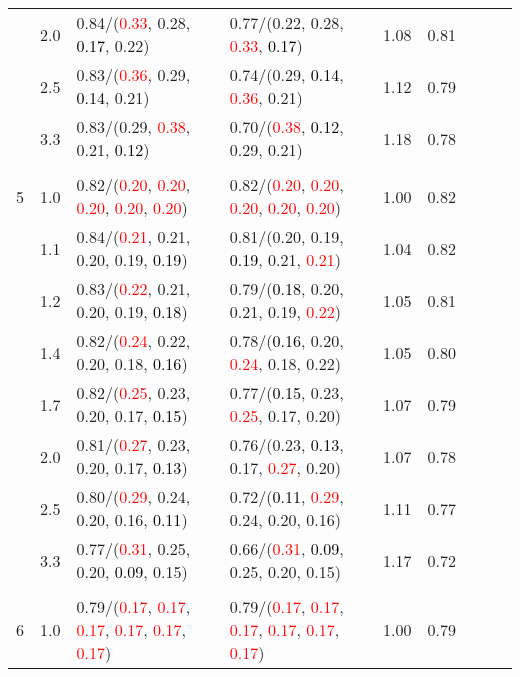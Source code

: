\documentclass[10pt,a4paper]{report}
\begin{document}
\begin{table}[!htbp]
\begin{center}
{\begin{tabular}{ccllccccc}
			&2.0&0.84/(\textcolor{red}{0.33}, 0.28, \textcolor{black}{0.17}, 0.22)&0.77/(0.22, 0.28, \textcolor{red}{0.33}, \textcolor{black}{0.17})&1.08&0.81\\
			&2.5&0.83/(\textcolor{red}{0.36}, 0.29, \textcolor{black}{0.14}, 0.21)&0.74/(0.29, \textcolor{black}{0.14}, \textcolor{red}{0.36}, 0.21)&1.12&0.79\\
			&3.3&0.83/(0.29, \textcolor{red}{0.38}, 0.21, \textcolor{black}{0.12})&0.70/(\textcolor{red}{0.38}, \textcolor{black}{0.12}, 0.29, 0.21)&1.18&0.78\\
			&&&&\\
			5			&1.0&0.82/(\textcolor{red}{0.20}, \textcolor{red}{0.20}, \textcolor{red}{0.20}, \textcolor{red}{0.20}, \textcolor{red}{0.20})&0.82/(\textcolor{red}{0.20}, \textcolor{red}{0.20}, \textcolor{red}{0.20}, \textcolor{red}{0.20}, \textcolor{red}{0.20})&1.00&0.82\\
			&1.1&0.84/(\textcolor{red}{0.21}, 0.21, 0.20, 0.19, \textcolor{black}{0.19})&0.81/(0.20, 0.19, \textcolor{black}{0.19}, 0.21, \textcolor{red}{0.21})&1.04&0.82\\
			&1.2&0.83/(\textcolor{red}{0.22}, 0.21, 0.20, 0.19, \textcolor{black}{0.18})&0.79/(\textcolor{black}{0.18}, 0.20, 0.21, 0.19, \textcolor{red}{0.22})&1.05&0.81\\
			&1.4&0.82/(\textcolor{red}{0.24}, 0.22, 0.20, 0.18, \textcolor{black}{0.16})&0.78/(\textcolor{black}{0.16}, 0.20, \textcolor{red}{0.24}, 0.18, 0.22)&1.05&0.80\\
			&1.7&0.82/(\textcolor{red}{0.25}, 0.23, 0.20, 0.17, \textcolor{black}{0.15})&0.77/(\textcolor{black}{0.15}, 0.23, \textcolor{red}{0.25}, 0.17, 0.20)&1.07&0.79\\
			&2.0&0.81/(\textcolor{red}{0.27}, 0.23, 0.20, 0.17, \textcolor{black}{0.13})&0.76/(0.23, \textcolor{black}{0.13}, 0.17, \textcolor{red}{0.27}, 0.20)&1.07&0.78\\
			&2.5&0.80/(\textcolor{red}{0.29}, 0.24, 0.20, 0.16, \textcolor{black}{0.11})&0.72/(\textcolor{black}{0.11}, \textcolor{red}{0.29}, 0.24, 0.20, 0.16)&1.11&0.77\\
			&3.3&0.77/(\textcolor{red}{0.31}, 0.25, 0.20, \textcolor{black}{0.09}, 0.15)&0.66/(\textcolor{red}{0.31}, \textcolor{black}{0.09}, 0.25, 0.20, 0.15)&1.17&0.72\\
			&&&&\\
			6			&1.0&0.79/(\textcolor{red}{0.17}, \textcolor{red}{0.17}, \textcolor{red}{0.17}, \textcolor{red}{0.17}, \textcolor{red}{0.17}, \textcolor{red}{0.17})&0.79/(\textcolor{red}{0.17}, \textcolor{red}{0.17}, \textcolor{red}{0.17}, \textcolor{red}{0.17}, \textcolor{red}{0.17}, \textcolor{red}{0.17})&1.00&0.79\\

\end{tabular}}
\end{center}
\end{table}
\end{document}
